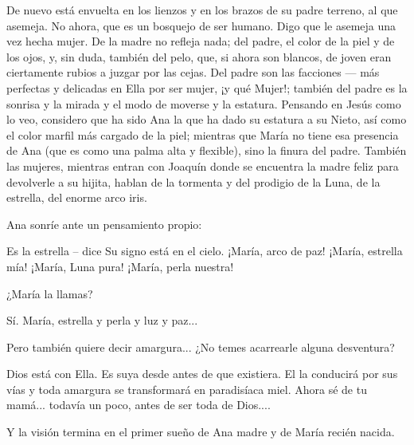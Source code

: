 \documentclass[12pt]{book} %
\begin{document}
De nuevo está envuelta en los lienzos y en los brazos de su padre terreno, al que asemeja. No ahora, que es un bosquejo de ser humano. Digo que le asemeja una vez hecha mujer. De la madre no refleja nada; del padre, el color de la piel y de los ojos, y, sin duda, también del pelo, que, si ahora son blancos, de joven eran ciertamente rubios a juzgar por las cejas. Del padre son las facciones — más perfectas y delicadas en Ella por ser mujer, ¡y qué Mujer!; también del padre es la sonrisa y la mirada y el modo de moverse y la estatura. Pensando en Jesús como lo veo, considero que ha sido Ana la que ha dado su estatura a su Nieto, así como el color marfil más cargado de la piel; mientras que María no tiene esa presencia de Ana (que es como una palma alta y flexible), sino la finura del padre. También las mujeres, mientras entran con Joaquín donde se encuentra la madre feliz para devolverle a su hijita, hablan de la tormenta y del prodigio de la Luna, de la estrella, del enorme arco iris. 

Ana sonríe ante un pensamiento propio: 

Es la estrella – dice Su signo está en el cielo. ¡María, arco de paz! ¡María, estrella mía! ¡María, Luna pura! ¡María, perla nuestra! 

¿María la llamas? 

Sí. María, estrella y perla y luz y paz... 

Pero también quiere decir amargura... ¿No temes acarrearle alguna desventura? 

Dios está con Ella. Es suya desde antes de que existiera. El la conducirá por sus vías y toda amargura se transformará en paradisíaca miel. Ahora sé de tu mamá... todavía un poco, antes de ser toda de Dios.... 

Y la visión termina en el primer sueño de Ana madre y de María recién nacida. 
\end{document}
